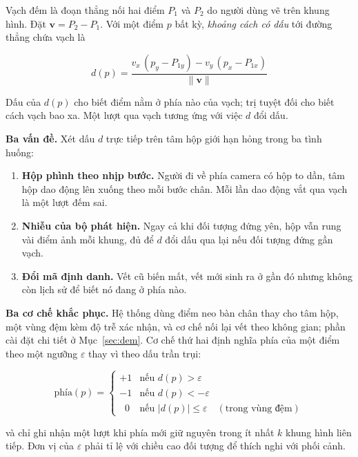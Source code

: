 Vạch đếm là đoạn thẳng nối hai điểm $P_1$ và $P_2$ do người dùng vẽ trên khung hình.
Đặt $\mathbf{v} = P_2 - P_1$. Với một điểm $p$ bất kỳ, \emph{khoảng cách có dấu} tới
đường thẳng chứa vạch là

\begin{equation}
  d(p) = \frac{v_x\,(p_y - P_{1y}) - v_y\,(p_x - P_{1x})}{\lVert \mathbf{v} \rVert}
  \label{eq:khoangcach}
\end{equation}

Dấu của $d(p)$ cho biết điểm nằm ở phía nào của vạch; trị tuyệt đối cho biết cách vạch
bao xa. Một lượt qua vạch tương ứng với việc $d$ đổi dấu.

\textbf{Ba vấn đề.} Xét dấu $d$ trực tiếp trên tâm hộp giới hạn
hỏng trong ba tình huống:

\begin{enumerate}[leftmargin=*, itemsep=2pt]
  \item \textbf{Hộp phình theo nhịp bước.} Người đi về phía camera có hộp to dần, tâm
        hộp dao động lên xuống theo mỗi bước chân. Mỗi lần dao động vắt qua vạch là một
        lượt đếm sai.
  \item \textbf{Nhiễu của bộ phát hiện.} Ngay cả khi đối tượng đứng yên, hộp vẫn rung
        vài điểm ảnh mỗi khung, đủ để $d$ đổi dấu qua lại nếu đối tượng đứng gần vạch.
  \item \textbf{Đổi mã định danh.} Vết cũ biến mất, vết mới sinh ra ở gần đó nhưng
        không còn lịch sử để biết nó đang ở phía nào.
\end{enumerate}

\textbf{Ba cơ chế khắc phục.} Hệ thống dùng điểm neo bàn chân thay cho tâm hộp,
một vùng đệm kèm độ trễ xác nhận, và cơ chế nối lại vết theo không gian;
phần cài đặt chi tiết ở Mục~\ref{sec:dem}. Cơ chế thứ hai định nghĩa phía của một điểm
theo một ngưỡng $\varepsilon$ thay vì theo dấu trần trụi:

\begin{equation}
  \text{phía}(p) =
  \begin{cases}
    +1 & \text{nếu } d(p) > \varepsilon \\
    -1 & \text{nếu } d(p) < -\varepsilon \\
    \;\;0 & \text{nếu } |d(p)| \leq \varepsilon \quad (\text{trong vùng đệm})
  \end{cases}
  \label{eq:phia}
\end{equation}

và chỉ ghi nhận một lượt khi phía mới giữ nguyên trong ít nhất $k$ khung hình liên tiếp.
Đơn vị của $\varepsilon$ phải tỉ lệ với chiều cao đối tượng để thích nghi với phối cảnh.

